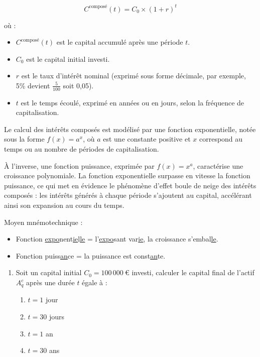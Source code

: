 \documentclass{article}
\begin{document}
\begin{enumerate}[label=\textbf{Q1.\arabic*}]
\begin{tcolorbox}
    \[
    C^{\text{composé}}(t) = C_0 \times (1 + r)^t
    \]
    
    où :
    \begin{itemize}
        \item \( C^{\text{composé}}(t) \) est le capital accumulé après une période \( t \).
        \item \( C_0 \) est le capital initial investi.
        \item \( r \) est le taux d'intérêt nominal (exprimé sous forme décimale, par exemple, 5\% devient $\frac{5}{100}$ soit 0,05).
        \item \( t \) est le temps écoulé, exprimé en années ou en jours, selon la fréquence de capitalisation.
    \end{itemize}
\end{tcolorbox}

\begin{tcolorbox}[
    colback=lightgreen, 
    colframe=lightgreen, 
    boxrule=0.5pt, 
    arc=0pt, 
    left=10pt, 
    right=10pt, 
    top=6pt, 
    bottom=6pt, 
    boxsep=2pt, 
    before upper={\faLightbulb\hspace{10pt}}
]
    Le calcul des intérêts composés est modélisé par une fonction exponentielle, notée sous la forme $f(x)=a^x$, où $a$ est une constante positive et $x$ correspond au temps ou au nombre de périodes de capitalisation.

    À l'inverse, une fonction puissance, exprimée par $f(x)=x^a$, caractérise une croissance polynomiale. La fonction exponentielle surpasse en vitesse la fonction puissance, ce qui met en évidence le phénomène d'effet boule de neige des intérêts composés : les intérêts générés à chaque période s'ajoutent au capital, accélérant ainsi son expansion au cours du temps.

    Moyen mnémotechnique : 
    \begin{itemize}
        \item Fonction \underline{expo}nent\underline{ie}l\underline{le} = l'\underline{expo}sant var\underline{ie}, la croissance s'embal\underline{le}.
        \item Fonction puiss\underline{an}ce = la puissance est const\underline{an}te.
    \end{itemize}
\end{tcolorbox}

    \begin{enumerate}[label=\textbf{Q2.\arabic*}]
        \item Soit un capital initial \( C_0 = 100\,000\ \text{€} \) investi, calculer le capital final de l'actif \( A_q^c \) après une durée \( t \) égale à :
        \begin{enumerate}[label=(\alph*)]
            \item \( t = 1 \) jour
            \item \( t = 30 \) jours
            \item \( t = 1 \) an
            \item \( t = 30 \) ans
        \end{enumerate}
    

\end{enumerate}
\end{enumerate}
\end{document}

